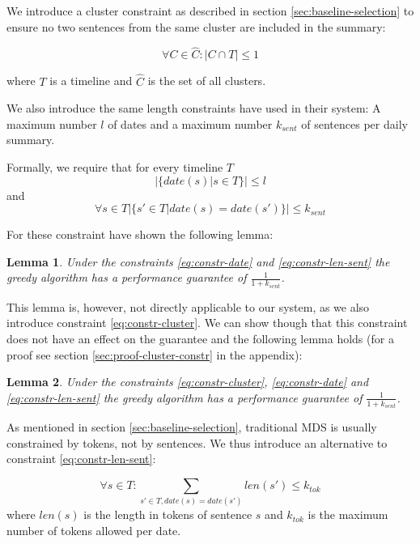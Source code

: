\documentclass[a4paper,BCOR=10mm]{report}
\newtheorem{lemma}{Lemma}
\numberwithin{lemma}{chapter}
\numberwithin{definition}{chapter}
\begin{document}
We introduce a cluster constraint as described in section \ref{sec:baseline-selection} to ensure no two sentences from the same cluster are included in the summary:

\begin{equation}
\forall C \in \widehat{C} \label{eq:constr-cluster}: |C \cap T| \leq 1
\end{equation}

where $T$ is a timeline and $\widehat{C}$ is the set of all clusters.

We also introduce the same length constraints \citet{markert} have used in their system: A maximum number $l$ of dates and a maximum number $k_{\mathit{sent}}$ of sentences per daily summary. 

Formally, we require that for every timeline $T$ 
\begin{equation}
|\{ \mathit{date}(s) | s \in T \}| \leq l \label{eq:constr-date}
\end{equation}
and
\begin{equation}
\forall s \in T |\{ s' \in T | \mathit{date}(s) = \mathit{date}(s') \}| \leq k_{\mathit{sent}} \label{eq:constr-len-sent}
\end{equation}

For these constraint \citet{markert} have shown the following lemma:
\begin{lemma}
Under the constraints \ref{eq:constr-date} and \ref{eq:constr-len-sent} the greedy algorithm has a performance guarantee of $\frac{1}{1 + k_{\mathit{sent}}}$.
\end{lemma}

This lemma is, however, not directly applicable to our system, as we also introduce constraint \ref{eq:constr-cluster}. We can show though that this constraint does not have an effect on the guarantee and the following lemma holds (for a proof see section \ref{sec:proof-cluster-constr} in the appendix):
\begin{lemma}
Under the constraints \ref{eq:constr-cluster}, \ref{eq:constr-date} and \ref{eq:constr-len-sent} the greedy algorithm has a performance guarantee of $\frac{1}{1 + k_{\mathit{sent}}}$.
\end{lemma}

As mentioned in section \ref{sec:baseline-selection}, traditional MDS is usually constrained by tokens, not by sentences.
We thus introduce an alternative to constraint \ref{eq:constr-len-sent}:

\begin{equation}
\forall s \in T: \sum_{s' \in T, \mathit{date}(s) = \mathit{date}(s')} \mathit{len}(s') \leq k_{\mathit{tok}} \label{eq:constr-len-tok}
\end{equation}
where $\mathit{len}(s)$ is the length in tokens of sentence $s$ and $k_{\mathit{tok}}$ is the maximum number of tokens allowed per date.
\end{document}
